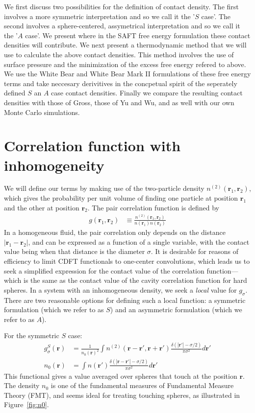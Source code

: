 \documentclass[letterpaper,twocolumn,amsmath,amssymb,jcp,10pt,aip]{revtex4-1}
\newcommand{\rr}{\textbf{r}}
\begin{document}
We first discuss two possibilities for the definition of contact
density.  The first involves a more symmetric interpretation and so we
call it the '$S$ case'.  The second involves a sphere-centered,
assymetrical interpretation and so we call it the '$A$ case'.  We
present where in the SAFT free energy formulation these contact
densities will contribute.  We next present a thermodynamic method
that we will use to calculate the above contact densities.  This
method involves the use of surface pressure and the minimization of
the excess free energy refered to above.  We use the White Bear and
White Bear Mark II formulations of these free energy terms and take
neccesary derivitives in the concpetual spirit of the seperately
defined $S$ an $A$ case contact densities.  Finally we compare the
resulting contact densities with those of Gross, those of Yu and Wu,
and as well with our own Monte Carlo simulations.


\section{Correlation function with inhomogeneity}

We will define our terms by making use of the two-particle density
$n^{(2)}(\rr_1,\rr_2)$, which gives the probability per unit volume of
finding one particle at position $\rr_1$ and the other at position
$\rr_2$.  The pair correlation function is defined by
\begin{align}
  g(\rr_1,\rr_2) &\equiv \frac{n^{(2)}(\rr_1,\rr_2)}{n(\rr_1)n(\rr_2)}
\end{align}
In a homogeneous fluid, the pair correlation only depends on the
distance $|\rr_1-\rr_2|$, and can be expressed as a function of a
single variable, with the contact value being when that distance is
the diameter $\sigma$.  It is desirable for reasons of efficiency to limit CDFT
functionals to one-center convolutions, which leads us to seek a
simplified expression for the contact value of the correlation
function---which is the same as the contact value of the cavity
correlation function for hard spheres.
In a system with an inhomogeneous density, we seek a \emph{local}
value for $g_\sigma$.  There are two reasonable options for defining
such a local function: a symmetric formulation (which we refer to as $S$) and an
asymmetric formulation (which we refer to as $A$).

For the symmetric $S$ case:
\begin{align}
  g^S_\sigma(\rr) &= \frac{1}{n_0(\rr)^2}\int n^{(2)}(\rr - \rr', \rr
  + \rr')
  \frac{\delta(|\rr'| -\sigma/2)}{\pi\sigma^2}d\rr' \label{eq:gS} \\
  n_0(\rr) &= \int n(\rr')\frac{\delta(|\rr-\rr'|-\sigma/2)}{\pi\sigma^2} d\rr'
\end{align}
This functional gives a value averaged over spheres that touch at the
position $\rr$.  The density $n_0$ is one of the fundamental measures
of Fundamental Measure Theory (FMT), and seems ideal for treating
touching spheres, as illustrated in Figure~\ref{fig:n0}.
\end{document}
